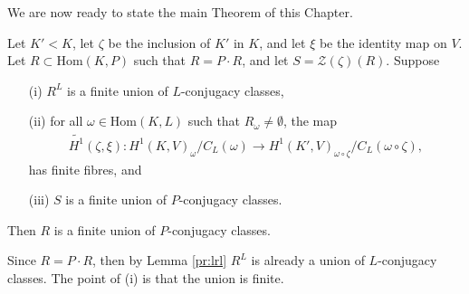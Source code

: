 We are now ready to state the main Theorem of this Chapter.

\begin{theorem}\label{main_thm} Let $K'<K$, let $\zeta$ be the inclusion of $K'$ in $K$, and let $\xi$ be the identity map on $V$. Let $R \subset \mathrm{Hom}(K, P)$ such that $R = P \cdot R$, and let $S = \mathcal{Z}(\zeta)(R)$. Suppose
	\begin{itemize}
		\item[(i)] $R^L$ is a finite union of $L$-conjugacy classes,
		\item[(ii)] for all $\omega \in \mathrm{Hom}(K, L)$ such that $R_\omega \neq \emptyset$, the map
			\begin{align*}
				\widetilde{H^1}(\zeta, \xi):H^1(K, V)_\omega/C_L(\omega) \rightarrow H^1(K', V)_{\omega\circ\zeta}/C_L(\omega\circ\zeta),
			\end{align*}
			has finite fibres, and
		\item[(iii)] $S$ is a finite union of $P$-conjugacy classes.
	\end{itemize}
	Then $R$ is a finite union of $P$-conjugacy classes.
\end{theorem}
\begin{remark}
	Since $R = P \cdot R$, then by Lemma \ref{pr:lrl} $R^L$ is already a union of $L$-conjugacy classes. The point of (i) is that the union is finite.
\end{remark}
